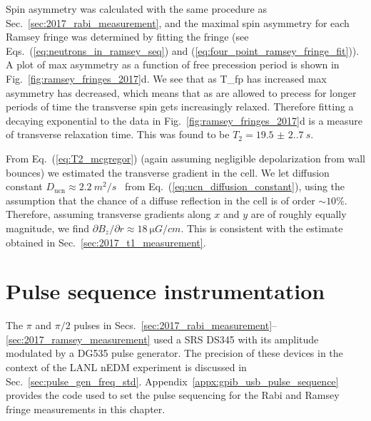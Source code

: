 Spin asymmetry was calculated with the same procedure as Sec.~\ref{sec:2017_rabi_measurement}, and the maximal spin asymmetry for each Ramsey fringe was determined by fitting the fringe (see Eqs.~(\ref{eq:neutrons_in_ramsey_seq}) and (\ref{eq:four_point_ramsey_fringe_fit})). A plot of max asymmetry as a function of free precession period is shown in Fig.~\ref{fig:ramsey_fringes_2017}d. We see that as \gls*{T_fp} has increased max asymmetry has decreased, which means that as \ucn are allowed to precess for longer periods of time the transverse spin gets increasingly relaxed. Therefore fitting a decaying exponential to the data in Fig.~\ref{fig:ramsey_fringes_2017}d is a measure of transverse relaxation time. This was found to be $T_2=\qty{19.5(2.7)}{s}$.

From Eq.~(\ref{eq:T2_mcgregor}) (again assuming negligible depolarization from wall bounces) we estimated the transverse gradient in the cell. We let diffusion constant $D_\text{ucn}\approx \qty{2.2}{m^2 \per s}$~\cite{golubUCN} from Eq.~(\ref{eq:ucn_diffusion_constant}), using the assumption that the chance of a diffuse reflection in the cell is of order $\sim 10\%$. Therefore, assuming transverse gradients along $x$ and $y$ are of roughly equally magnitude, we find $\partial B_z/\partial r \approx \qty{18}{\micro G \per cm}$. This is consistent with the estimate obtained in Sec.~\ref{sec:2017_t1_measurement}.


\section{Pulse sequence instrumentation}


The $\pi$ and $\pi/2$ pulses in Secs.~\ref{sec:2017_rabi_measurement}--\ref{sec:2017_ramsey_measurement} used a SRS DS345 with its amplitude modulated by a DG535 pulse generator. The precision of these devices in the context of the LANL nEDM experiment is discussed in Sec.~\ref{sec:pulse_gen_freq_std}. Appendix~\ref{appx:gpib_usb_pulse_sequence} provides the code used to set the pulse sequencing for the Rabi and Ramsey fringe measurements in this chapter.

\vspace{\baselineskip}

